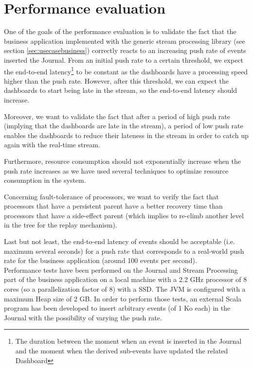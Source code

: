 \chapter{Performance evaluation}
\label{sec:perfeval}

One of the goals of the performance evaluation is to validate the fact that the business application implemented with the generic stream processing library (see section \ref{sec:usecasebusiness}) correctly reacts to an increasing push rate of events inserted the Journal. From an initial push rate to a certain threshold, we expect the end-to-end latency\footnote{The duration between the moment when an event is inserted in the Journal and the moment when the derived sub-events have updated the related Dashboard} to be constant as the dashboards have a processing speed higher than the push rate. However, after this threshold, we can expect the dashboards to start being late in the stream, so the end-to-end latency should increase.

Moreover, we want to validate the fact that after a period of high push rate (implying that the dashboards are late in the stream), a period of low push rate enables the dashboards to reduce their lateness in the stream in order to catch up again with the real-time stream.

Furthermore, resource consumption should not exponentially increase when the push rate increases as we have used several techniques to optimize resource consumption in the system.

Concerning fault-tolerance of processors, we want to verify the fact that processors that have a persistent parent have a better recovery time than processors that have a side-effect parent (which implies to re-climb another level in the tree for the replay mechanism).

Last but not least, the end-to-end latency of events should be acceptable (i.e. maximum several seconds) for a push rate that corresponds to a real-world push rate for the business application (around 100 events per second).
\\

Performance tests have been performed on the Journal and Stream Processing part of the business application on a local machine with a 2.2 GHz processor of 8 cores (so a parallelization factor of 8) with a SSD. The JVM is configured with a maximum Heap size of 2 GB. In order to perform those tests, an external Scala program has been developed to insert arbitrary events (of 1 Ko each) in the Journal with the possibility of varying the push rate.


